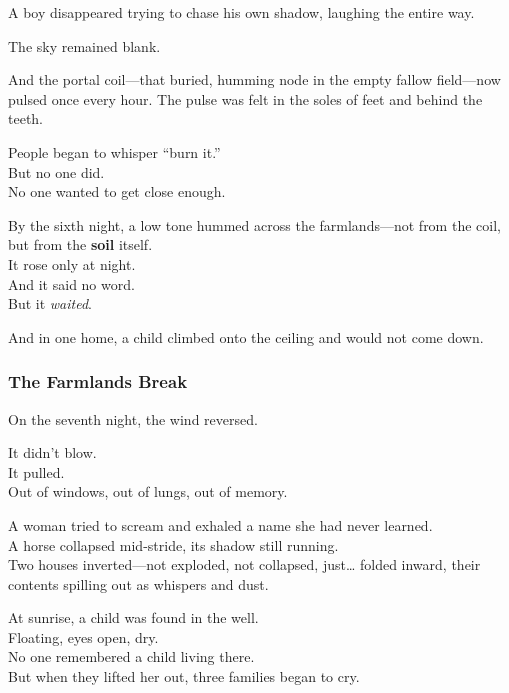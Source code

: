 \documentclass[12pt]{article}
\begin{document}
\vspace{0.5em}
A boy disappeared trying to chase his own shadow, laughing the entire way.

\vspace{0.5em}
The sky remained blank.

\vspace{0.5em}
And the portal coil---that buried, humming node in the empty fallow field---now pulsed once every hour. The pulse was felt in the soles of feet and behind the teeth.

\vspace{0.5em}
People began to whisper ``burn it.''\\
But no one did.\\
No one wanted to get close enough.

\vspace{0.5em}
By the sixth night, a low tone hummed across the farmlands---not from the coil, but from the \textbf{soil} itself.\\
It rose only at night.\\
And it said no word.\\
But it \textit{waited}.

\vspace{0.5em}
And in one home, a child climbed onto the ceiling and would not come down.

\dotfill

\subsubsection{The Farmlands Break}

On the seventh night, the wind reversed.

\vspace{0.5em}
It didn’t blow.\\
It pulled.\\
Out of windows, out of lungs, out of memory.

\vspace{0.5em}
A woman tried to scream and exhaled a name she had never learned.\\
A horse collapsed mid-stride, its shadow still running.\\
Two houses inverted---not exploded, not collapsed, just\ldots{} folded inward, their contents spilling out as whispers and dust.

\vspace{0.5em}
At sunrise, a child was found in the well.\\
Floating, eyes open, dry.\\
No one remembered a child living there.\\
But when they lifted her out, three families began to cry.
\end{document}
